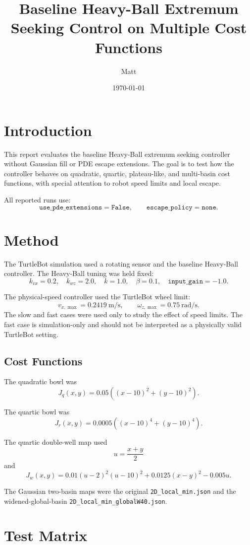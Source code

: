 \documentclass[11pt]{article}
\title{Baseline Heavy-Ball Extremum Seeking Control on Multiple Cost Functions}
\author{Matt}
\date{\today}
\begin{document}
\maketitle

\section{Introduction}

This report evaluates the baseline Heavy-Ball extremum seeking controller
without Gaussian fill or PDE escape extensions. The goal is to test how the
controller behaves on quadratic, quartic, plateau-like, and multi-basin cost
functions, with special attention to robot speed limits and local escape.

All reported runs use:
\[
\texttt{use\_pde\_extensions}=\texttt{False}, \qquad
\texttt{escape\_policy}=\texttt{none}.
\]

\section{Method}

The TurtleBot simulation used a rotating sensor and the baseline Heavy-Ball
controller. The Heavy-Ball tuning was held fixed:
\[
k_{vx}=0.2, \quad k_{wz}=2.0, \quad k=1.0, \quad
\beta=0.1, \quad \texttt{input\_gain}=-1.0.
\]

The physical-speed controller used the TurtleBot wheel limit:
\[
v_{x,\max}=0.2419\ \mathrm{m/s}, \qquad
\omega_{z,\max}=0.75\ \mathrm{rad/s}.
\]
The slow and fast cases were used only to study the effect of speed limits.
The fast case is simulation-only and should not be interpreted as a physically
valid TurtleBot setting.

\subsection{Cost Functions}

The quadratic bowl was
\[
J_q(x,y)=0.05\left((x-10)^2+(y-10)^2\right).
\]

The quartic bowl was
\[
J_r(x,y)=0.0005\left((x-10)^4+(y-10)^4\right).
\]

The quartic double-well map used
\[
u=\frac{x+y}{2}
\]
and
\[
J_w(x,y)=0.01(u-2)^2(u-10)^2+0.0125(x-y)^2-0.005u.
\]

The Gaussian two-basin maps were the original \texttt{2D\_local\_min.json}
and the widened-global-basin \texttt{2D\_local\_min\_globalW40.json}.

\section{Test Matrix}
\end{document}
